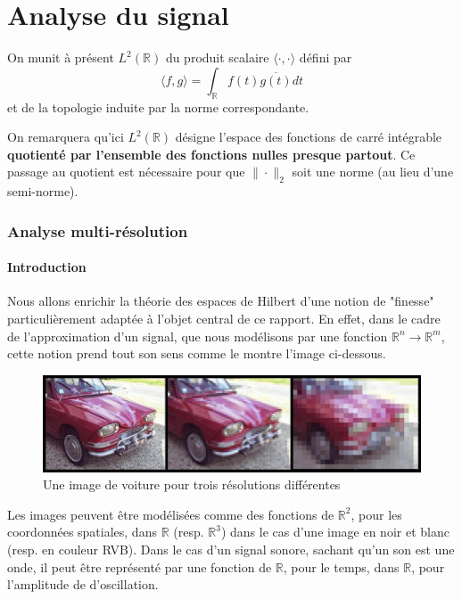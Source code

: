 \documentclass[]{article}
\theoremstyle{remark}
\theoremstyle{definition}
\begin{document}
	\part{Analyse du signal}
	
	On munit à présent $L^2(\mathbb{R})$ du produit scalaire $\langle \cdot, \cdot \rangle$ défini par $$\langle f, g\rangle = \int_\mathbb{R} f(t) \overline{g(t)} dt$$
	et de la topologie induite par la norme correspondante.
	
	On remarquera qu'ici $L^2(\mathbb{R})$ désigne l'espace des fonctions de carré intégrable \textbf{quotienté par l'ensemble des fonctions nulles presque partout}. Ce passage au quotient est nécessaire pour que $\|\cdot \|_2$ soit une norme (au lieu d'une semi-norme).
	
	\section{Analyse multi-résolution}
	
	\subsection{Introduction}
	
	Nous allons enrichir la théorie des espaces de Hilbert d'une notion de "finesse"  particulièrement adaptée à l'objet central de ce rapport. En effet, dans le cadre de l'approximation d'un signal, que nous modélisons par une fonction $\mathbb{R}^n \rightarrow \mathbb{R}^m$, cette notion prend tout son sens comme le montre l'image ci-dessous.
	
	\begin{figure}[h]
		\centering
		\includegraphics[width=350pt]{Resolution_wikipedia.jpg}
		\caption{Une image de voiture pour trois résolutions différentes}
	\end{figure}
	
	Les images peuvent être modélisées comme des fonctions de $\mathbb{R}^2$, pour les coordonnées spatiales, dans $\mathbb{R}$ (resp. $\mathbb{R}^3$) dans le cas d'une image en noir et blanc (resp. en couleur RVB). Dans le cas d'un signal sonore, sachant qu'un son est une onde, il peut être représenté par une fonction de $\mathbb{R}$, pour le temps, dans $\mathbb{R}$, pour l'amplitude de d'oscillation.
	
\end{document}
